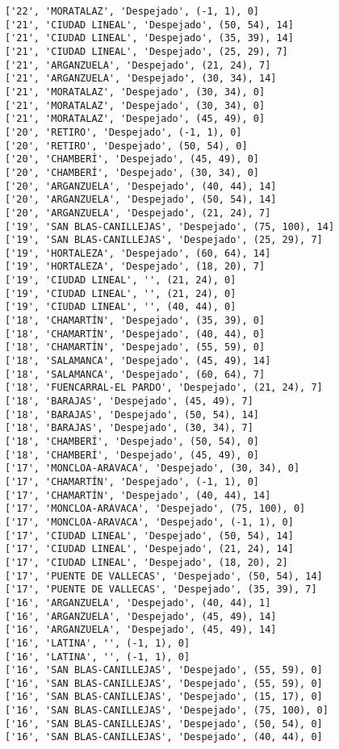\documentclass[11pt]{article}
\begin{document}
\begin{Verbatim}[commandchars=\\\{\}]
['22', 'MORATALAZ', 'Despejado', (-1, 1), 0]
['21', 'CIUDAD LINEAL', 'Despejado', (50, 54), 14]
['21', 'CIUDAD LINEAL', 'Despejado', (35, 39), 14]
['21', 'CIUDAD LINEAL', 'Despejado', (25, 29), 7]
['21', 'ARGANZUELA', 'Despejado', (21, 24), 7]
['21', 'ARGANZUELA', 'Despejado', (30, 34), 14]
['21', 'MORATALAZ', 'Despejado', (30, 34), 0]
['21', 'MORATALAZ', 'Despejado', (30, 34), 0]
['21', 'MORATALAZ', 'Despejado', (45, 49), 0]
['20', 'RETIRO', 'Despejado', (-1, 1), 0]
['20', 'RETIRO', 'Despejado', (50, 54), 0]
['20', 'CHAMBERÍ', 'Despejado', (45, 49), 0]
['20', 'CHAMBERÍ', 'Despejado', (30, 34), 0]
['20', 'ARGANZUELA', 'Despejado', (40, 44), 14]
['20', 'ARGANZUELA', 'Despejado', (50, 54), 14]
['20', 'ARGANZUELA', 'Despejado', (21, 24), 7]
['19', 'SAN BLAS-CANILLEJAS', 'Despejado', (75, 100), 14]
['19', 'SAN BLAS-CANILLEJAS', 'Despejado', (25, 29), 7]
['19', 'HORTALEZA', 'Despejado', (60, 64), 14]
['19', 'HORTALEZA', 'Despejado', (18, 20), 7]
['19', 'CIUDAD LINEAL', '', (21, 24), 0]
['19', 'CIUDAD LINEAL', '', (21, 24), 0]
['19', 'CIUDAD LINEAL', '', (40, 44), 0]
['18', 'CHAMARTÍN', 'Despejado', (35, 39), 0]
['18', 'CHAMARTÍN', 'Despejado', (40, 44), 0]
['18', 'CHAMARTÍN', 'Despejado', (55, 59), 0]
['18', 'SALAMANCA', 'Despejado', (45, 49), 14]
['18', 'SALAMANCA', 'Despejado', (60, 64), 7]
['18', 'FUENCARRAL-EL PARDO', 'Despejado', (21, 24), 7]
['18', 'BARAJAS', 'Despejado', (45, 49), 7]
['18', 'BARAJAS', 'Despejado', (50, 54), 14]
['18', 'BARAJAS', 'Despejado', (30, 34), 7]
['18', 'CHAMBERÍ', 'Despejado', (50, 54), 0]
['18', 'CHAMBERÍ', 'Despejado', (45, 49), 0]
['17', 'MONCLOA-ARAVACA', 'Despejado', (30, 34), 0]
['17', 'CHAMARTÍN', 'Despejado', (-1, 1), 0]
['17', 'CHAMARTÍN', 'Despejado', (40, 44), 14]
['17', 'MONCLOA-ARAVACA', 'Despejado', (75, 100), 0]
['17', 'MONCLOA-ARAVACA', 'Despejado', (-1, 1), 0]
['17', 'CIUDAD LINEAL', 'Despejado', (50, 54), 14]
['17', 'CIUDAD LINEAL', 'Despejado', (21, 24), 14]
['17', 'CIUDAD LINEAL', 'Despejado', (18, 20), 2]
['17', 'PUENTE DE VALLECAS', 'Despejado', (50, 54), 14]
['17', 'PUENTE DE VALLECAS', 'Despejado', (35, 39), 7]
['16', 'ARGANZUELA', 'Despejado', (40, 44), 1]
['16', 'ARGANZUELA', 'Despejado', (45, 49), 14]
['16', 'ARGANZUELA', 'Despejado', (45, 49), 14]
['16', 'LATINA', '', (-1, 1), 0]
['16', 'LATINA', '', (-1, 1), 0]
['16', 'SAN BLAS-CANILLEJAS', 'Despejado', (55, 59), 0]
['16', 'SAN BLAS-CANILLEJAS', 'Despejado', (55, 59), 0]
['16', 'SAN BLAS-CANILLEJAS', 'Despejado', (15, 17), 0]
['16', 'SAN BLAS-CANILLEJAS', 'Despejado', (75, 100), 0]
['16', 'SAN BLAS-CANILLEJAS', 'Despejado', (50, 54), 0]
['16', 'SAN BLAS-CANILLEJAS', 'Despejado', (40, 44), 0]

\end{Verbatim}
\end{document}
